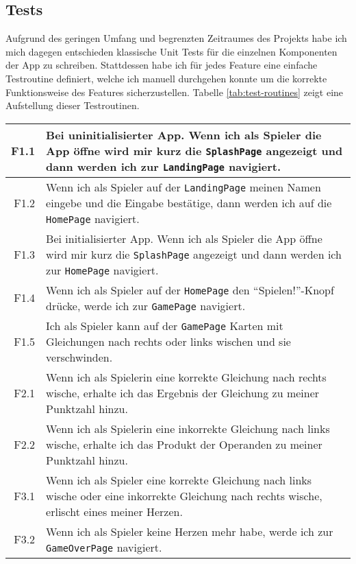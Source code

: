 \subsection{Tests}

Aufgrund des geringen Umfang und begrenzten Zeitraumes des Projekts habe ich mich dagegen entschieden klassische Unit Tests für die einzelnen Komponenten der App zu schreiben.
Stattdessen habe ich für jedes Feature eine einfache Testroutine definiert, welche ich manuell durchgehen konnte um die korrekte Funktionsweise des Features sicherzustellen.
Tabelle \ref{tab:test-routines} zeigt eine Aufstellung dieser Testroutinen.

\begin{table}
  \begin{longtabu}{| >{\ttfamily} r | X |}
    \hline
    F1.1 & Bei uninitialisierter App. Wenn ich als Spieler die App öffne wird mir kurz die \texttt{SplashPage} angezeigt und dann werden ich zur \texttt{LandingPage} navigiert. \\
    \hline
    F1.2 & Wenn ich als Spieler auf der \texttt{LandingPage} meinen Namen eingebe und die Eingabe bestätige, dann werden ich auf die \texttt{HomePage} navigiert. \\
    \hline
    F1.3 & Bei initialisierter App. Wenn ich als Spieler die App öffne wird mir kurz die \texttt{SplashPage} angezeigt und dann werden ich zur \texttt{HomePage} navigiert. \\
    \hline
    F1.4 & Wenn ich als Spieler auf der \texttt{HomePage} den \enquote{Spielen!}-Knopf drücke, werde ich zur \texttt{GamePage} navigiert.\\
    \hline
    F1.5 & Ich als Spieler kann auf der \texttt{GamePage} Karten mit Gleichungen nach rechts oder links wischen und sie verschwinden.\\
    \hline
    F2.1 & Wenn ich als Spielerin eine korrekte Gleichung nach rechts wische, erhalte ich das Ergebnis der Gleichung zu meiner Punktzahl hinzu.\\
    \hline
    F2.2 & Wenn ich als Spielerin eine inkorrekte Gleichung nach links wische, erhalte ich das Produkt der Operanden zu meiner Punktzahl hinzu.\\
    \hline
    F3.1 & Wenn ich als Spieler eine korrekte Gleichung nach links wische oder eine inkorrekte Gleichung nach rechts wische, erlischt eines meiner Herzen.\\
    \hline
    F3.2 & Wenn ich als Spieler keine Herzen mehr habe, werde ich zur \texttt{GameOverPage} navigiert.\\

\end{longtabu}
\end{table}
